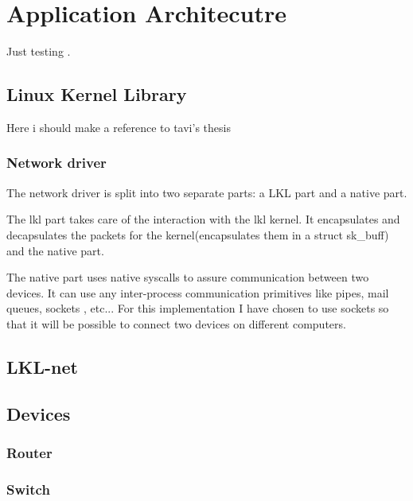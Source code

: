 \chapter{Application Architecutre}
\label{chapter:arch}

Just testing \cite{linnetarch}.

\section{Linux Kernel Library}
Here i should make a reference to tavi's thesis\cite{thesis}
\label{sec:lkl}

\subsection{Network driver}
\label{sec:net-driver}

The network driver is split into two separate parts: a LKL part and a native part.

The lkl part takes care of the interaction with the lkl kernel. It encapsulates
and decapsulates the packets for the kernel(encapsulates them in a struct sk_buff)
and the native part.

The native part uses native syscalls to assure communication between two devices.
It can use any inter-process communication primitives like pipes, mail queues, sockets
, etc... For this implementation I have chosen to use sockets so that it will be possible
to connect two devices on different computers.


\section{LKL-net}
\label{sec:lkl-net}


\section{Devices}
\label{sec:devices}

\subsection{Router}
\label{sub-sec:router}
\cite{linnetarch}
\subsection{Switch}
\label{sub-sec:switch}

